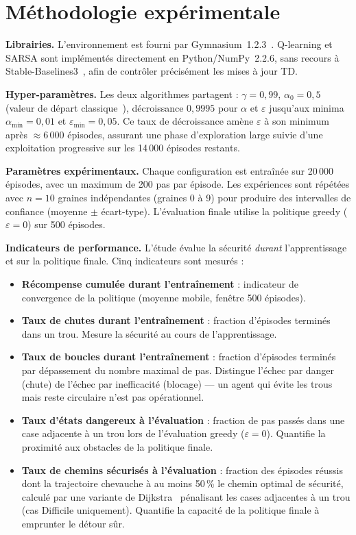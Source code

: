 \documentclass{article}
\begin{document}
\section{Méthodologie expérimentale}

\textbf{Librairies.} L'environnement est fourni par Gymnasium~1.2.3~\citep{towers2024}. Q-learning et SARSA sont implémentés directement en Python/NumPy~2.2.6, sans recours à Stable-Baselines3~\citep{raffin2021}, afin de contrôler précisément les mises à jour TD.

\textbf{Hyper-paramètres.} Les deux algorithmes partagent : $\gamma = 0{,}99$, $\alpha_0 = 0{,}5$ (valeur de départ classique~\citep{sutton2018}), décroissance $0{,}9995$ pour $\alpha$ et $\varepsilon$ jusqu'aux minima $\alpha_{\min}=0{,}01$ et $\varepsilon_{\min}=0{,}05$. Ce taux de décroissance amène $\varepsilon$ à son minimum après $\approx\!6\,000$ épisodes, assurant une phase d'exploration large suivie d'une exploitation progressive sur les 14\,000 épisodes restants.

\textbf{Paramètres expérimentaux.} Chaque configuration est entraînée sur 20\,000 épisodes, avec un maximum de 200 pas par épisode. Les expériences sont répétées avec $n=10$ graines indépendantes (graines 0 à 9) pour produire des intervalles de confiance (moyenne $\pm$ écart-type). L'évaluation finale utilise la politique greedy ($\varepsilon=0$) sur 500 épisodes.

\textbf{Indicateurs de performance.} L'étude évalue la sécurité \emph{durant} l'apprentissage et sur la politique finale. Cinq indicateurs sont mesurés :
\begin{itemize}
  \item \textbf{Récompense cumulée durant l'entraînement} : indicateur de convergence de la politique (moyenne mobile, fenêtre 500 épisodes).
  \item \textbf{Taux de chutes durant l'entraînement} : fraction d'épisodes terminés dans un trou. Mesure la sécurité au cours de l'apprentissage.
  \item \textbf{Taux de boucles durant l'entraînement} : fraction d'épisodes terminés par dépassement du nombre maximal de pas. Distingue l'échec par danger (chute) de l'échec par inefficacité (blocage) — un agent qui évite les trous mais reste circulaire n'est pas opérationnel.
  \item \textbf{Taux d'états dangereux à l'évaluation} : fraction de pas passés dans une case adjacente à un trou lors de l'évaluation greedy ($\varepsilon=0$). Quantifie la proximité aux obstacles de la politique finale.
  \item \textbf{Taux de chemins sécurisés à l'évaluation} : fraction des épisodes réussis dont la trajectoire chevauche à au moins 50\,\% le chemin optimal de sécurité, calculé par une variante de Dijkstra~\citep{dijkstra1959} pénalisant les cases adjacentes à un trou (cas Difficile uniquement). Quantifie la capacité de la politique finale à emprunter le détour sûr.
\end{itemize}
\end{document}
